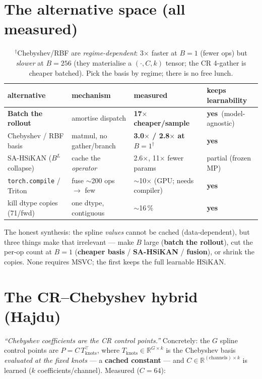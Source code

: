 \documentclass[11pt]{article}
\newcommand{\yescell}{\textcolor{green!55!black}{\textbf{yes}}}
\begin{document}
\section{The alternative space (all measured)}
\begin{table}[h]\centering\small
\begin{tabular}{llll}
\toprule
alternative & mechanism & measured & keeps learnability \\
\midrule
\textbf{Batch the rollout} & amortise dispatch & \textbf{17$\times$ cheaper/sample} & \yescell\ (model-agnostic) \\
Chebyshev / RBF basis & matmul, no gather/branch & \textbf{3.0$\times$ / 2.8$\times$ at $B{=}1$}$^\dagger$ & \yescell \\
SA-HSiKAN ($B^{L}$ collapse) & cache the \emph{operator} & 2.6$\times$, 11$\times$ fewer params & partial (frozen MP) \\
\texttt{torch.compile} / Triton & fuse $\sim$200 ops $\to$ few & $\sim$10$\times$ (GPU; needs compiler) & \yescell \\
kill dtype copies (71/fwd) & one dtype, contiguous & $\sim$16\,\% & \yescell \\
\bottomrule
\end{tabular}
\caption{$^\dagger$Chebyshev/RBF are \emph{regime-dependent}: 3$\times$ faster at $B{=}1$ (fewer ops) but
\emph{slower} at $B{=}256$ (they materialise a $(\cdot,C,k)$ tensor; the CR 4-gather is cheaper batched). Pick the
basis by regime; there is no free lunch.}
\end{table}

\noindent The honest synthesis: the spline \emph{values} cannot be cached (data-dependent), but three things make
that irrelevant --- make $B$ large (\textbf{batch the rollout}), cut the per-op count at $B{=}1$ (\textbf{cheaper
basis} / \textbf{SA-HSiKAN} / \textbf{fusion}), or shrink the copies. None requires MSVC; the first keeps the full
learnable HSiKAN.

\section{The CR--Chebyshev hybrid (Hajdu)}
\emph{``Chebyshev coefficients are the CR control points.''} Concretely: the $G$ spline control points are
$P = C\,T_{\mathrm{knots}}^{\top}$, where $T_{\mathrm{knots}}\in\mathbb{R}^{G\times k}$ is the Chebyshev basis
\emph{evaluated at the fixed knots} --- a \textbf{cached constant} --- and $C\in\mathbb{R}^{(\mathrm{channels})\times
k}$ is learned ($k$ coefficients/channel). Measured ($C{=}64$):
\end{document}
